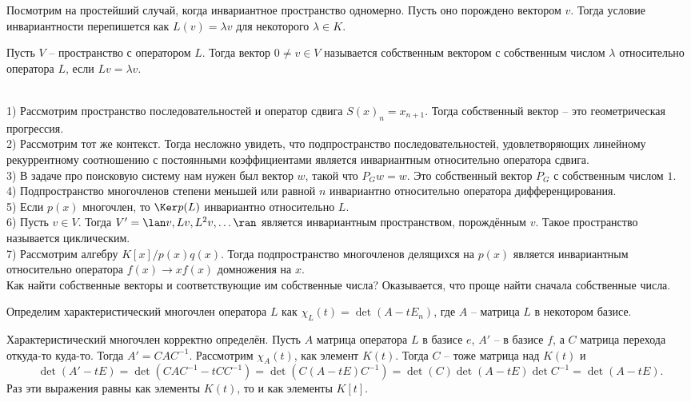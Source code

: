 Посмотрим на простейший случай, когда инвариантное пространство одномерно. Пусть оно порождено вектором $v$. Тогда условие инвариантности перепишется как $L(v) = \lambda v$ для некоторого $\lambda \in K$.


\dfn Пусть $V$ -- пространство с оператором $L$. Тогда вектор $0\neq v\in V$ называется собственным вектором с собственным числом $\lambda$ относительно оператора $L$, если $Lv=\lambda v$.
\edfn





\exm \\
1) Рассмотрим пространство  последовательностей и оператор сдвига $S(x)_n= x_{n+1}$. Тогда собственный вектор -- это геометрическая прогрессия.\\
2) Рассмотрим тот же контекст. Тогда несложно увидеть, что подпространство последовательностей, удовлетворяющих линейному рекуррентному соотношению с постоянными коэффициентами является инвариантным относительно оператора сдвига.\\
3) В задаче про поисковую систему нам нужен был вектор $w$, такой что $P_G w=w$. Это собственный вектор $P_G$ с собственным числом $1$.\\
4) Подпространство многочленов степени меньшей или равной $n$ инвариантно относительно оператора дифференцирования.\\
5) Если $p(x)$ многочлен, то $\Ker p(L)$ инвариантно относительно $L$.\\
6) Пусть $v \in V$. Тогда  $V'=\lan v, Lv, L^2v,\dots \ran$ является инвариантным пространством, порождённым $v$. Такое пространство называется циклическим.\\
7) Рассмотрим алгебру $K[x]/p(x)q(x)$. Тогда подпространство многочленов делящихся на $p(x)$ является инвариантным относительно оператора $f(x) \to x f(x)$ домножения на $x$.\\




Как найти собственные векторы и соответствующие им собственные числа? Оказывается, что проще найти сначала собственные числа.

\dfn Определим характеристический многочлен оператора $L$ как $\chi_L(t)=\det(A-tE_n)$, где $A$ -- матрица $L$ в некотором базисе.
\edfn

\lm Характеристический многочлен корректно определён.
\elm
\proof Пусть $A$ матрица оператора $L$ в базисе $e$, $A'$ -- в базисе $f$, а $C$ матрица перехода откуда-то куда-то. Тогда $A'=CAC^{-1}$. Рассмотрим $\chi_A(t)$, как элемент $K(t)$. Тогда $C$ -- тоже матрица над $K(t)$ и
$$\det(A'-tE)=\det(CAC^{-1}-tCC^{-1})=\det(C(A-tE)C^{-1})=\det(C)\det(A-tE)\det C^{-1}=\det(A-tE).$$
Раз эти выражения равны как элементы $K(t)$, то и как элементы $K[t]$.
\endproof

